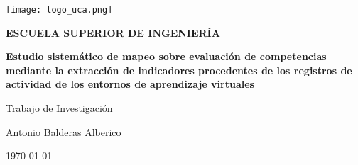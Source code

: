 

\begin{titlepage}

  \begin{center}

    \texttt{[image: logo\_uca.png]} \\
    
    \vspace{2.0cm}
    
    \LARGE{\textbf{ESCUELA SUPERIOR DE INGENIERÍA}} \\
    
    \vspace{1.0cm}
    
    \Large{\textbf{Estudio sistemático de mapeo sobre evaluación de competencias mediante la extracción de indicadores procedentes de los registros de actividad de los entornos de aprendizaje virtuales}} \\
    
    \vspace{3.0cm}
    
    \Large{Trabajo de Investigación} \\
    
    \vspace{2.0cm}
    
    \Large{Antonio Balderas Alberico} \\
  
    \vspace{0.5cm}

    \large{\today}
    
  \end{center}
\end{titlepage}
